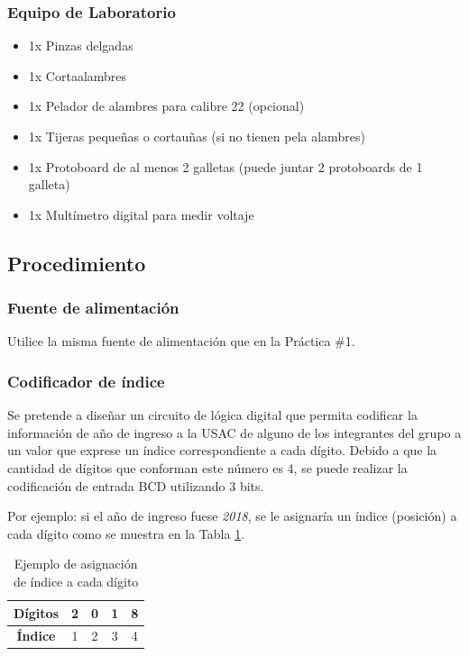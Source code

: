 \subsubsection*{Equipo de Laboratorio}
\begin{itemize}
    \item 1x Pinzas delgadas
    \item 1x Cortaalambres
    \item 1x Pelador de alambres para calibre 22 (opcional)
    \item 1x Tijeras pequeñas o cortauñas (si no tienen pela alambres)
    \item 1x Protoboard de al menos 2 galletas (puede juntar 2 protoboards de 1 galleta)
    \item 1x Multímetro digital para medir voltaje
\end{itemize}

\subsection{Procedimiento}
\subsubsection{Fuente de alimentación}
Utilice la misma fuente de alimentación que en la Práctica \#1.

\subsubsection{Codificador de índice}
Se pretende a diseñar un circuito de lógica digital que permita codificar la información de año de ingreso a la USAC de alguno de los
integrantes del grupo a un valor que exprese un índice correspondiente a cada dígito. Debido a que la cantidad de dígitos
que conforman este número es 4, se puede realizar la codificación de entrada BCD utilizando 3 bits.

\vspace{14pt}

Por ejemplo: si el año de ingreso fuese \emph{2018}, se le asignaría un índice (posición) a cada dígito como se
muestra en la Tabla \ref{Table:ejemploIndices}.

\begin{table}[H]
    \centering
    \begin{tabular}{|c|c|c|c|c|}
        \hline
        \textbf{Dígitos} & 2 & 0 & 1 & 8 \\ \hline
        \textbf{Índice}  & 1 & 2 & 3 & 4 \\ \hline
    \end{tabular}
    \caption{Ejemplo de asignación de índice a cada dígito}
    \label{Table:ejemploIndices}
\end{table}


